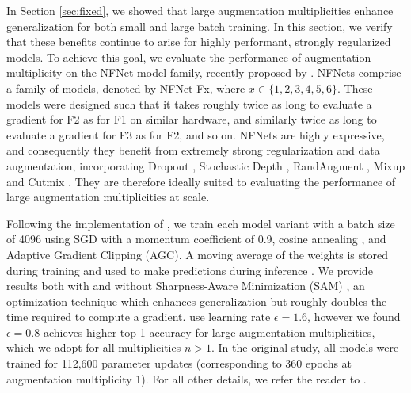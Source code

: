 \documentclass{article}
\begin{document}
In Section \ref{sec:fixed}, we showed that large augmentation multiplicities enhance generalization for both small and large batch training. In this section, we verify that these benefits continue to arise for highly performant, strongly regularized models. To achieve this goal, we evaluate the performance of augmentation multiplicity on the NFNet model family, recently proposed by \citet{brock2021high}. NFNets comprise a family of models, denoted by NFNet-Fx, where $x\in \{1,2,3,4,5,6\}$. These models were designed such that it takes roughly twice as long to evaluate a gradient for F2 as for F1 on similar hardware, and similarly twice as long to evaluate a gradient for F3 as for F2, and so on. NFNets are highly expressive, and consequently they benefit from extremely strong regularization and data augmentation, incorporating Dropout \citep{srivastava2014dropout}, Stochastic Depth \citep{huang2016deep}, RandAugment \citep{cubuk2020randaugment}, Mixup \citep{zhang2017mixup} and Cutmix \citep{yun2019cutmix}. They are therefore ideally suited to evaluating the performance of large augmentation multiplicities at scale. 





Following the implementation of \citet{brock2021high}, we train each model variant with a batch size of 4096 using SGD with a momentum coefficient of 0.9, cosine annealing \citep{loshchilov2016sgdr}, and Adaptive Gradient Clipping (AGC). A moving average of the weights is stored during training and used to make predictions during inference \citep{szegedy2015going}. We provide results both with and without Sharpness-Aware Minimization (SAM) \citep{foret2020sharpness}, an optimization technique which enhances generalization but roughly doubles the time required to compute a gradient. \citet{brock2021high} use learning rate $\epsilon = 1.6$, however we found $\epsilon = 0.8$ achieves higher top-1 accuracy for large augmentation multiplicities, which we adopt for all multiplicities $n>1$. In the original study, all models were trained for 112,600 parameter updates (corresponding to 360 epochs at augmentation multiplicity 1). For all other details, we refer the reader to \citet{brock2021high}. 
\end{document}
